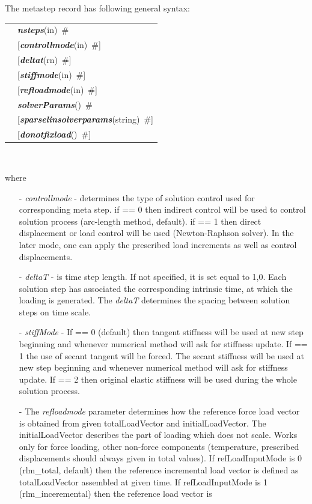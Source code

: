 \documentclass[a4paper]{article}
\makeatletter
\newcommand{\param}[1]{{\em #1}}
\newcommand{\fieldVal}[2]{\mbox{({\it\bf{#1}\#)\tiny (#2)}}}
\newcommand{\keywordnotype}[1]{\mbox{{\it{\bf{#1}}}}}
\newcommand{\keyword}[2]{\mbox{{\keywordnotype{#1}\tiny (#2)}}}
\newcommand{\field}[2]{\mbox{\keyword{#1}{#2}~\#}}
\newcommand{\optField}[2]{\mbox{[\field{#1}{#2}]}}
\newenvironment{record}[1][]{\begin{tabular}{|ll}}{\end{tabular}\\}
\newcommand{\recentry}[2]{{#1}&{#2}\\}
\newcounter{rcc}
\newenvironment{record}[1][\textwidth]{\setcounter{rcc}{0}\begin{tabular*}{#1}{|ll@{\extracolsep{\fill}}r}}{\end{tabular*}\\}
\newcommand{\recentry}[2]{\ifthenelse{\value{rcc}>0}{&$\backslash$ \\}{\setcounter{rcc}{1}}{#1}&{#2}}
\makeatother
\begin{document}
\noindent
The metastep record has following general syntax:\\
\begin{record}
\recentry{\hspace{10mm}}{\field{nsteps}{in}}
\recentry{}{\optField{controllmode}{in}}
\recentry{}{\optField{deltat}{rn}} \recentry{}{\optField{stiffmode}{in}}
\recentry{}{\optField{refloadmode}{in}} \recentry{}{\field{solverParams}{}}
\recentry{}{\optField{sparselinsolverparams}{string}} \recentry{}{\optField{donotfixload}{}}
\end{record}

where
\begin{itemize}
\item[-] \param{controllmode} - determines the type of solution
control used for corresponding meta step. if == 0 then indirect
control will be used to control solution process (arc-length method, default). if == 1
then direct displacement or load control will be used (Newton-Raphson solver). In the later
mode, one can apply the prescribed load increments as well as
control displacements.
\item[-] \param{deltaT} - is time step length. If not specified, it is
set equal to 1,0. Each solution step has associated the corresponding
intrinsic time, at which the loading is generated. The \param{deltaT}
determines the spacing between solution steps on time scale.
\item[-] \param{stiffMode} - If == 0 (default) then tangent stiffness will be used
at new step beginning and whenever numerical method will ask for
stiffness update. If == 1 the use of secant tangent will be forced.
The secant stiffness will be used at new step beginning
and whenever numerical method will ask for stiffness update.
If == 2 then original elastic stiffness will
be used during the whole solution process.
\item[-] The \param{refloadmode} parameter determines how the reference force load vector
is obtained from given totalLoadVector and initialLoadVector.
The initialLoadVector describes the part of loading which does not scale. Works only for force loading, other non-force components (temperature, prescribed displacements should always given in total values).
If refLoadInputMode is 0 (rlm\_total, default) then the reference incremental load vector is defined as
totalLoadVector assembled at given time.
If refLoadInputMode is 1 (rlm\_inceremental) then the reference load vector is

\end{itemize}
\end{document}
